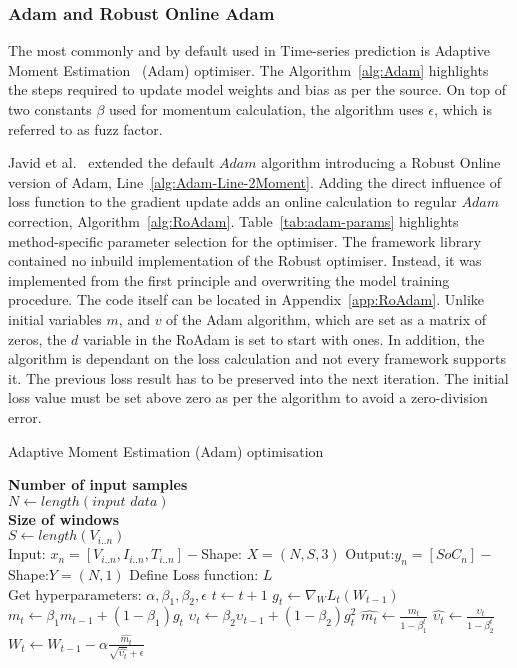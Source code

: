 \subsubsection{Adam and Robust Online Adam}
The most commonly and by default used in Time-series prediction is Adaptive Moment Estimation~\cite{kingma_adam_2017} (Adam) optimiser.
The Algorithm~\ref{alg:Adam} highlights the steps required to update model weights and bias as per the source.
On top of two constants $\beta$ used for momentum calculation, the algorithm uses $\epsilon$, which is referred to as fuzz factor.

%
%
Javid et al.~\cite{javid_adaptive_2020} extended the default $Adam$ algorithm introducing a Robust Online version of Adam, Line~\ref{alg:Adam-Line-2Moment}.
Adding the direct influence of loss function to the gradient update adds an online calculation to regular $Adam$ correction, Algorithm~\ref{alg:RoAdam}.
Table~\ref{tab:adam-params} highlights method-specific parameter selection for the optimiser.
The framework library contained no inbuild implementation of the Robust optimiser.
Instead, it was implemented from the first principle and overwriting the model training procedure.
The code itself can be located in Appendix~\ref{app:RoAdam}.
Unlike initial variables $m$, and $v$ of the Adam algorithm, which are set as a matrix of zeros, the $d$ variable in the RoAdam is set to start with ones.
In addition, the algorithm is dependant on the loss calculation and not every framework supports it.
The previous loss result has to be preserved into the next iteration.
The initial loss value must be set above zero as per the algorithm to avoid a zero-division error.
\begin{algorithm}
  \caption{Adaptive Moment Estimation (Adam) optimisation}
  \begin{algorithmic}[1]
    \STATE \textbf{Number of input samples} \\ $N\gets length(\textit{input data})$\\
    \STATE \textbf{Size of windows} \\ $S\gets length(V_{i..n})$\\
    \STATE Input: $x_n = [V_{i..n}, I_{i..n}, T_{i..n}] - $Shape: $X = (N, S, 3)$
    \STATE Output:$y_n = [SoC_{n}] - $Shape:$Y = (N, 1)$
    \STATE Define Loss function: $L$ \\
           Get hyperparameters: $\alpha, \beta_1, \beta_2, \epsilon$
    \STATE $t \gets t+1$
    \STATE $g_t \gets \nabla_W L_t (W_{t-1})$ 
    \STATE $m_t \gets \beta_1 m_{t-1}+(1-\beta_1) g_t $ 
    \STATE $\upsilon_t \gets \beta_2 \upsilon_{t-1}+ \left(1-\beta_2 \right)g^2_t $ 
    \STATE $\hat{m_t} \gets \frac{m_t}{1-\beta^t_1}$ 
    \STATE $\hat{\upsilon_t} \gets \frac{\upsilon_t}{1-\beta^t_2} $ 
    \STATE $W_t \gets W_{t-1}- \alpha \frac{\hat{m_t}}{\sqrt{\hat{\upsilon_t}}+\epsilon} $ 
    \ENDWHILE
  \end{algorithmic}
  \label{alg:Adam}
\end{algorithm}

